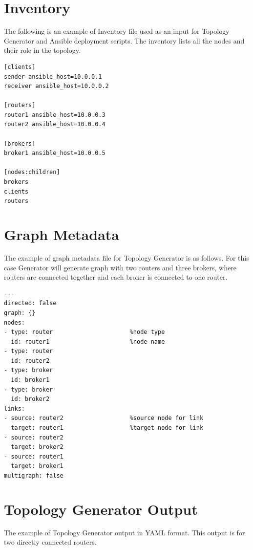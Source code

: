 \section*{Inventory}
\label{AP:Inventory}
The following is an example of Inventory file used as an input for Topology Generator and Ansible deployment scripts. The inventory lists all the nodes and their role in the topology.

\begin{verbatim}
[clients]
sender ansible_host=10.0.0.1
receiver ansible_host=10.0.0.2

[routers]
router1 ansible_host=10.0.0.3
router2 ansible_host=10.0.0.4

[brokers]
broker1 ansible_host=10.0.0.5

[nodes:children]
brokers
clients
routers
\end{verbatim}

\section*{Graph Metadata}
\label{AP:Graph Metadata}
The example of graph metadata file for Topology Generator is as follows. For this case Generator will generate graph with two routers and three brokers, where routers are connected together and each broker is connected to one router.

\begin{verbatim}
---
directed: false
graph: {}
nodes:
- type: router						%node type
  id: router1						%node name
- type: router
  id: router2
- type: broker
  id: broker1
- type: broker
  id: broker2
links:
- source: router2					%source node for link
  target: router1					%target node for link
- source: router2
  target: broker2
- source: router1
  target: broker1
multigraph: false
\end{verbatim}

\section*{Topology Generator Output}
\label{AP:Topology Generator Output}
The example of Topology Generator output in YAML format. This output is for two directly connected routers.

